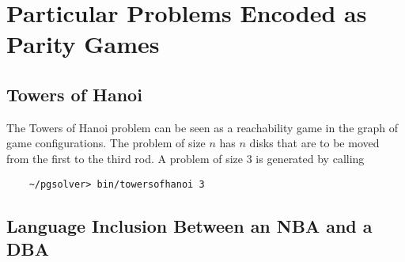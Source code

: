 \section{Particular Problems Encoded as Parity Games}

\subsection{Towers of Hanoi}

The Towers of Hanoi problem can be seen as a reachability game in the graph of game configurations.
The problem of size $n$ has $n$ disks that are to be moved from the first to the third rod.
A problem of size $3$ is generated by calling
\begin{verbatim}
    ~/pgsolver> bin/towersofhanoi 3
\end{verbatim}


\subsection{Language Inclusion Between an NBA and a DBA}


